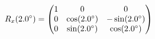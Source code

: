 \documentclass[preview]{standalone}
\begin{document}
\begin{align*}
\special{dvisvgm:raw <g id='unique000'>}R_x(2.0^\circ) = \begin{pmatrix} 1 & 0 & 0 \\ 0 & \cos(2.0^\circ) & -\sin(2.0^\circ) \\ 0 & \sin(2.0^\circ) & \cos(2.0^\circ) \end{pmatrix}\special{dvisvgm:raw </g>}
\end{align*}
\end{document}
